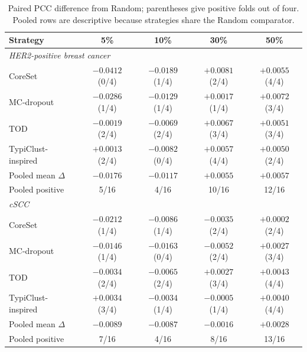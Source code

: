 \documentclass[]{spie}
\begin{document}
\begin{table}[htbp]
\centering
\caption{Paired PCC difference from Random; parentheses give positive folds out of four. Pooled rows are descriptive because strategies share the Random comparator.}
\label{tab:paired}
\begin{tabular}{lcccc}
\hline
Strategy & 5\% & 10\% & 30\% & 50\% \\
\hline
\multicolumn{5}{l}{\emph{HER2-positive breast cancer}} \\
CoreSet~\cite{sener2018active} & $-0.0412$ (0/4) & $-0.0189$ (1/4) & $+0.0081$ (2/4) & $+0.0055$ (4/4) \\
MC-dropout~\cite{gal2016dropout} & $-0.0286$ (1/4) & $-0.0129$ (1/4) & $+0.0017$ (1/4) & $+0.0072$ (3/4) \\
TOD~\cite{huang2021semi} & $-0.0019$ (2/4) & $-0.0069$ (2/4) & $+0.0067$ (3/4) & $+0.0051$ (3/4) \\
TypiClust-inspired~\cite{hacohen2022active} & $+0.0013$ (2/4) & $-0.0082$ (0/4) & $+0.0057$ (4/4) & $+0.0050$ (2/4) \\
Pooled mean $\Delta$ & $-0.0176$ & $-0.0117$ & $+0.0055$ & $+0.0057$ \\
Pooled positive & 5/16 & 4/16 & 10/16 & 12/16 \\
\hline
\multicolumn{5}{l}{\emph{cSCC}} \\
CoreSet~\cite{sener2018active} & $-0.0212$ (1/4) & $-0.0086$ (1/4) & $-0.0035$ (2/4) & $+0.0002$ (2/4) \\
MC-dropout~\cite{gal2016dropout} & $-0.0146$ (1/4) & $-0.0163$ (0/4) & $-0.0052$ (2/4) & $+0.0027$ (3/4) \\
TOD~\cite{huang2021semi} & $-0.0034$ (2/4) & $-0.0065$ (2/4) & $+0.0027$ (3/4) & $+0.0043$ (4/4) \\
TypiClust-inspired~\cite{hacohen2022active} & $+0.0034$ (3/4) & $-0.0034$ (1/4) & $-0.0005$ (1/4) & $+0.0040$ (4/4) \\
Pooled mean $\Delta$ & $-0.0089$ & $-0.0087$ & $-0.0016$ & $+0.0028$ \\
Pooled positive & 7/16 & 4/16 & 8/16 & 13/16 \\
\hline
\end{tabular}
\end{table}
\end{document}
